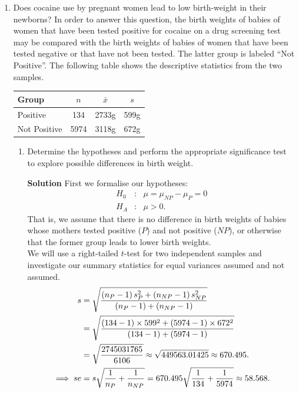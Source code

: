 \begin{enumerate}
    \item Does cocaine use by pregnant women lead to low birth-weight in their newborns? In order to answer this question, the birth weights of babies of women that have been tested positive for cocaine on a drug screening test may be compared with the birth weights of babies of women that have been tested negative or that have not been tested. The latter group is labeled ``Not Positive''. The following table shows the descriptive statistics from the two samples.
    \FloatBarrier
    \begin{table}[h]
    \centering
    \begin{tabular}{l|c|c|c}
    Group & $n$ & $\bar{x}$ & $s$ \\ \hline
    Positive & 134 & 2733g & 599g \\
    Not Positive & 5974 & 3118g & 672g
    \end{tabular}
    \end{table}
    \FloatBarrier
    \begin{enumerate}
        \item Determine the hypotheses and perform the appropriate significance test to explore possible differences in birth weight.
        \begin{framed}{\textbf{Solution}}
        First we formalise our hypotheses:
        \[
        \begin{matrix}
        H_0 & : & \mu = \mu_{NP} - \mu_{P} = 0 \\
        H_A & : & \mu >0 .
        \end{matrix}
        \]
        That is, we assume that there is no difference in birth weights of babies whose mothers tested positive ($P$) and not positive ($NP$), or otherwise that the former group leads to lower birth weights. \\
        We will use a right-tailed $t$-test for two independent samples and investigate our summary statistics for equal variances assumed and not assumed.
        \begin{align}
            s &= \sqrt{\frac{\brac{n_P - 1}s_P^2 + \brac{n_{NP} - 1}s_{NP}^2}{\brac{n_P - 1} + \brac{n_{NP} - 1}}} \\
            &= \sqrt{\frac{\brac{134 - 1}\times 599^2 + \brac{5974-1}\times 672^2}{\brac{134 - 1} + \brac{5974-1}}}\\
            &= \sqrt{\frac{2745031765}{6106}} \approx \sqrt{449563.01425} \approx 670.495. \\
            \implies se &= s \sqrt{\frac{1}{n_P} + \frac{1}{n_{NP}}} = 670.495 \sqrt{\frac{1}{134} + \frac{1}{5974}} \approx 58.568. \\

\end{align}
\end{framed}
\end{enumerate}
\end{enumerate}
